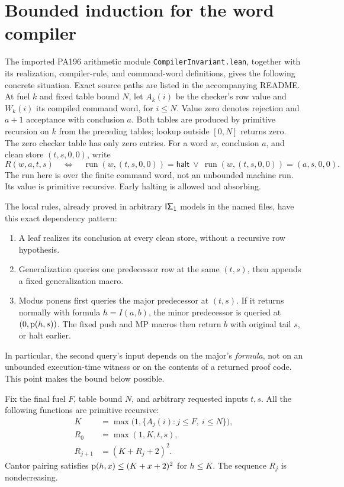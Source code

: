 \section{Bounded induction for the word compiler}

The imported PA196 arithmetic module \texttt{CompilerInvariant.lean},
together with its realization, compiler-rule, and command-word definitions,
gives the following concrete situation. Exact source paths are listed in
the accompanying README.
At fuel $k$ and fixed table bound $N$, let $A_k(i)$ be the checker's row
value and $W_k(i)$ its compiled command word, for $i\le N$.
Value zero denotes rejection and $a+1$ acceptance with conclusion $a$.
Both tables are produced by primitive recursion on $k$ from the preceding
tables; lookup outside $[0,N]$ returns zero. The zero checker table has only
zero entries. For a word $w$, conclusion $a$, and clean store $(t,s,0,0)$,
write
\[
 R(w,a,t,s)\quad\Longleftrightarrow\quad
 \operatorname{run}(w,(t,s,0,0))=\mathsf{halt}
 \ \lor\
 \operatorname{run}(w,(t,s,0,0))=(a,s,0,0).
\]
The run here is over the finite command word, not an unbounded machine run.
Its value is primitive recursive. Early halting is allowed and absorbing.

The local rules, already proved in arbitrary $\mathsf{I\Sigma_1}$ models in the named
files, have this exact dependency pattern:
\begin{enumerate}
\item A leaf realizes its conclusion at every clean store, without a
      recursive row hypothesis.
\item Generalization queries one predecessor row at the same $(t,s)$,
      then appends a fixed generalization macro.
\item Modus ponens first queries the major predecessor at $(t,s)$.
      If it returns normally with formula $h=I(a,b)$, the minor predecessor
      is queried at $(0,\operatorname{p}(h,s))$. The fixed push and MP macros then return
      $b$ with original tail $s$, or halt earlier.
\end{enumerate}
In particular, the second query's input depends on the major's \emph{formula},
not on an unbounded execution-time witness or on the contents of a returned
proof code. This point makes the bound below possible.

Fix the final fuel $F$, table bound $N$, and arbitrary requested inputs $t,s$.
All the following functions are primitive recursive:
\begin{align*}
 K&=\max\bigl(1,\{A_j(i):j\le F,\ i\le N\}\bigr),\\
 R_0&=\max(1,K,t,s),\\
 R_{j+1}&=(K+R_j+2)^2.
\end{align*}
Cantor pairing satisfies $\operatorname{p}(h,x)\le(K+x+2)^2$ for $h\le K$.
The sequence $R_j$ is nondecreasing.

